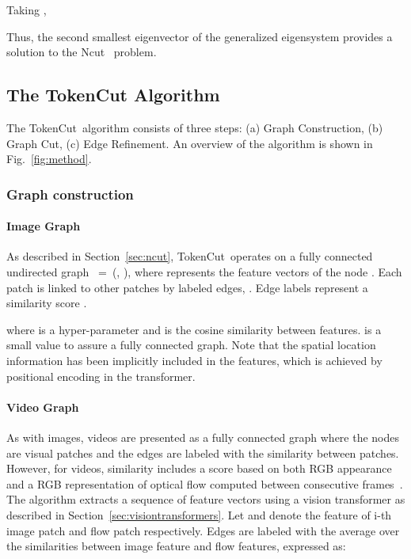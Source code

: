 \documentclass[twocolumn]{article}
\newcommand{\name} {TokenCut}
\begin{document}
   
  

Taking ,



Thus, the second smallest eigenvector of the generalized
eigensystem  provides a solution to the Ncut~\cite{shi2000normalized} problem.



\subsection{The TokenCut Algorithm}
\label{sec:tokencut}

The \name~algorithm consists of three steps: (a) Graph Construction, (b) Graph Cut, (c) Edge Refinement. An overview of the algorithm is shown in Fig.~\ref{fig:method}. 

\subsubsection{Graph construction}
\paragraph*{Image Graph}
\label{sec:image_graph}
As described in Section~\ref{sec:ncut},  \name~operates on a fully connected undirected graph ~=~(, ), where  represents the feature vectors of the node . Each patch is linked to other patches by labeled edges,  . Edge labels represent a similarity score . 



where  is a hyper-parameter and  is the cosine similarity between features.  is a small value 
 to assure a fully connected graph.
Note that the spatial location information has been implicitly included in the features, which is achieved by positional encoding in the transformer. 

\paragraph*{Video Graph} As with images, videos are presented as a fully connected graph where the nodes  are  visual patches and the edges  are labeled with the similarity between patches. However, for videos, similarity includes a score based on both RGB appearance and a RGB representation of optical flow computed between consecutive frames~\cite{baker2011database}. 
The algorithm extracts a sequence of feature vectors using a vision transformer as described in Section~\ref{sec:visiontransformers}. 
Let   and  denote  the feature of i-th image patch and flow patch respectively. Edges are labeled with  the average 
over the similarities between image feature and flow features, expressed as:
\end{document}
